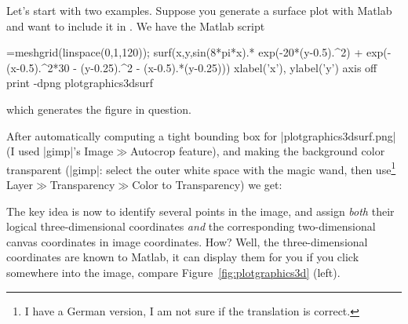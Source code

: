 {{Let's start with two examples. Suppose you generate a surface plot with Matlab
and want to include it in \PGFPlots{}. We have the Matlab script
%
\begin{codeexample}=meshgrid(linspace(0,1,120));
surf(x,y,sin(8*pi*x).* exp(-20*(y-0.5).^2) + exp(-(x-0.5).^2*30 - (y-0.25).^2 - (x-0.5).*(y-0.25)))
xlabel('x'), ylabel('y')
axis off
print -dpng plotgraphics3dsurf
\end{codeexample}
%
\noindent which generates the figure in question.

After automatically computing a tight bounding box for |plotgraphics3dsurf.png|
(I used |gimp|'s Image$\gg$Autocrop feature), and making the background color
transparent (|gimp|: select the outer white space with the magic wand, then
use\footnote{I have a German version, I am not sure if the translation is
correct.} Layer$\gg$Transparency$\gg$Color to Transparency) we get:

{\setlength{\fboxsep}{0pt}%
\centering%
%
}

The key idea is now to identify several points in the image, and assign
\emph{both} their logical three-dimensional coordinates \emph{and} the
corresponding two-dimensional canvas coordinates in image coordinates. How?
Well, the three-dimensional coordinates are known to Matlab, it can display
them for you if you click somewhere into the image, compare
Figure~\ref{fig:plotgraphics3d} (left).


}}

